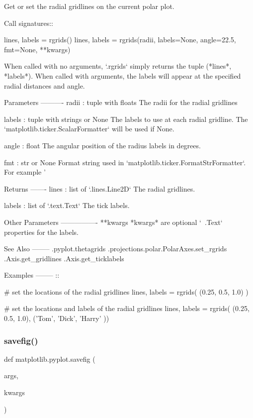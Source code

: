 \begin{DoxyVerb}Get or set the radial gridlines on the current polar plot.

Call signatures::

 lines, labels = rgrids()
 lines, labels = rgrids(radii, labels=None, angle=22.5, fmt=None, **kwargs)

When called with no arguments, `.rgrids` simply returns the tuple
(*lines*, *labels*). When called with arguments, the labels will
appear at the specified radial distances and angle.

Parameters
----------
radii : tuple with floats
    The radii for the radial gridlines

labels : tuple with strings or None
    The labels to use at each radial gridline. The
    `matplotlib.ticker.ScalarFormatter` will be used if None.

angle : float
    The angular position of the radius labels in degrees.

fmt : str or None
    Format string used in `matplotlib.ticker.FormatStrFormatter`.
    For example '%

Returns
-------
lines : list of `.lines.Line2D`
    The radial gridlines.

labels : list of `.text.Text`
    The tick labels.

Other Parameters
----------------
**kwargs
    *kwargs* are optional `~.Text` properties for the labels.

See Also
--------
.pyplot.thetagrids
.projections.polar.PolarAxes.set_rgrids
.Axis.get_gridlines
.Axis.get_ticklabels

Examples
--------
::

  # set the locations of the radial gridlines
  lines, labels = rgrids( (0.25, 0.5, 1.0) )

  # set the locations and labels of the radial gridlines
  lines, labels = rgrids( (0.25, 0.5, 1.0), ('Tom', 'Dick', 'Harry' ))
\end{DoxyVerb}
 \mbox{\label{namespacematplotlib_1_1pyplot_aab3d07a21b2fcea932693b94188e4144}} 
\subsubsection{\texorpdfstring{savefig()}{savefig()}}
{\footnotesize\ttfamily def matplotlib.\+pyplot.\+savefig (\begin{DoxyParamCaption}\item[{}]{args,  }\item[{}]{kwargs }\end{DoxyParamCaption})}

